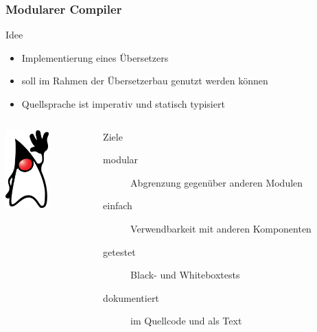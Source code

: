 \documentclass[ucs,9pt]{beamer}
\begin{document}
\begin{frame}
  \frametitle{Modularer Compiler}
  \begin{block}{Idee}
    \begin{itemize}
      \item Implementierung eines Übersetzers
      \item soll im Rahmen der Übersetzerbau genutzt werden können
      \item Quellsprache ist imperativ und statisch typisiert
    \end{itemize}
  \end{block}

  \begin{columns}
    \begin{column}{0.3\textwidth}
  \begin{center}
    \includegraphics[height=3cm]{java_duke}
  \end{center}
\end{column}
    \begin{column}{0.7\textwidth}
  \begin{block}{Ziele}
      \begin{description}
          \item[modular] Abgrenzung gegenüber anderen Modulen
          \item[einfach] Verwendbarkeit mit anderen Komponenten
          \item[getestet] Black- und Whiteboxtests
          \item[dokumentiert] im Quellcode und als Text
      \end{description}
  \end{block}
\end{column}
  \end{columns}
\end{frame}
\end{document}
